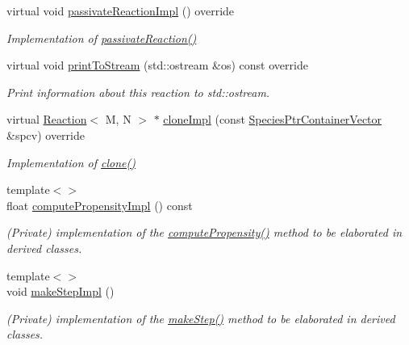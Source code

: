 \begin{DoxyCompactItemize}
virtual void \hyperlink{classchem_1_1Reaction_a691c21e0428d9e5894a6903b5997936f}{passivate\-Reaction\-Impl} () override
\begin{DoxyCompactList}\small\item\em Implementation of \hyperlink{classchem_1_1ReactionBase_a9fe4cf91fcff8c4aea65e759841c28fe}{passivate\-Reaction()} \end{DoxyCompactList}\item 
virtual void \hyperlink{classchem_1_1Reaction_aab3ab648fdbcf495df822a4fbdbcae21}{print\-To\-Stream} (std\-::ostream \&os) const override
\begin{DoxyCompactList}\small\item\em Print information about this reaction to std\-::ostream. \end{DoxyCompactList}\item 
virtual \hyperlink{classchem_1_1Reaction}{Reaction}$<$ M, N $>$ $\ast$ \hyperlink{classchem_1_1Reaction_a26efcc4b38c615c7d63f3fb1cfae070e}{clone\-Impl} (const \hyperlink{classchem_1_1SpeciesPtrContainerVector}{Species\-Ptr\-Container\-Vector} \&spcv) override
\begin{DoxyCompactList}\small\item\em Implementation of \hyperlink{classchem_1_1ReactionBase_a6d8e6fe06e073991fe263393ec418867}{clone()} \end{DoxyCompactList}\item 
{\footnotesize template$<$$>$ }\\float \hyperlink{classchem_1_1Reaction_ad0245708cd816ceccf686eebaf06353b}{compute\-Propensity\-Impl} () const
\begin{DoxyCompactList}\small\item\em (Private) implementation of the \hyperlink{classchem_1_1ReactionBase_a3e91b5d0c44fcb81bb17d2d0fee7947d}{compute\-Propensity()} method to be elaborated in derived classes. \end{DoxyCompactList}\item 
{\footnotesize template$<$$>$ }\\void \hyperlink{classchem_1_1Reaction_ac1ac05b087d53ff5bcc9e5e00e83bb1d}{make\-Step\-Impl} ()
\begin{DoxyCompactList}\small\item\em (Private) implementation of the \hyperlink{classchem_1_1ReactionBase_acb5575b08ca39fc6dd7a571fb246806b}{make\-Step()} method to be elaborated in derived classes. \end{DoxyCompactList}\end{DoxyCompactItemize}
